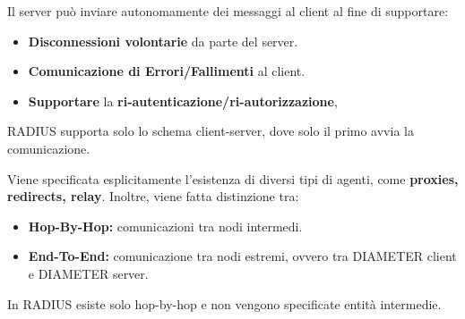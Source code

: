 \begin{proposition}
Il server può inviare autonomamente dei messaggi al client al fine di supportare:
    \begin{itemize}
        \item \textbf{Disconnessioni volontarie} da parte del server.
        \item \textbf{Comunicazione di Errori/Fallimenti} al client.
        \item \textbf{Supportare} la \textbf{ri-autenticazione/ri-autorizzazione},
    \end{itemize}
\end{proposition}
    \begin{remark}
    RADIUS supporta solo lo schema client-server, dove solo il primo avvia la comunicazione.
    \end{remark}
\begin{proposition}
Viene specificata esplicitamente l'esistenza di diversi tipi di agenti, come \textbf{proxies, redirects, relay}. Inoltre, viene fatta distinzione tra:
    \begin{itemize}
        \item \textbf{Hop-By-Hop:} comunicazioni tra nodi intermedi.
        \item \textbf{End-To-End:} comunicazione tra nodi estremi, ovvero tra DIAMETER client e DIAMETER server.
    \end{itemize}
\end{proposition}
\begin{remark}
    In RADIUS esiste solo hop-by-hop e non vengono specificate entità intermedie.
\end{remark}

